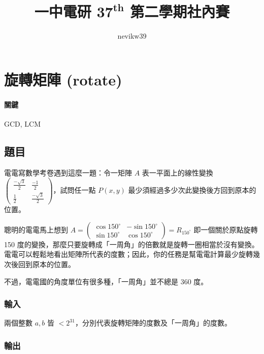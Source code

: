 \documentclass[a4paper,10pt]{article}
\title{\fontseries{b}一中電研 $\mathbf{37^{th}}$ 第二學期社內賽 \enspace {\huge\fontseries{eb}\selectfont 題目解析}}
\author{\fontshape{it}nevikw39}
\begin{document}
\maketitle

\begin{abstract}


\end{abstract}

\section{旋轉矩陣 (rotate)}

\paragraph{關鍵} GCD, LCM

\subsection{題目}

電電寫數學考卷遇到這麼一題：令一矩陣 $A$ 表一平面上的線性變換 $\begin{pmatrix} \frac{-\sqrt{3}}{2} & \frac{-1}{2}\\ \frac{1}{2} & \frac{-\sqrt{3}}{2} \end{pmatrix}$，試問任一點 $P(x, y)$ 最少須經過多少次此變換後方回到原本的位置。

聰明的電電馬上想到 $A = \begin{pmatrix} \cos 150^{\circ} & -\sin 150^{\circ}\\ \sin 150^{\circ} & \cos 150^{\circ} \end{pmatrix} = R_{150^{\circ}}$ 即一個關於原點旋轉 150 度的變換，那麼只要旋轉成「一周角」的倍數就是旋轉一圈相當於沒有變換。電電可以輕鬆地看出矩陣所代表的度數；因此，你的任務是幫電電計算最少旋轉幾次後回到原本的位置。

不過，電電國的角度單位有很多種，「一周角」並不總是 360 度。

\subsubsection{輸入}

兩個整數 $a, b$ 皆 $< 2^{31}$，分別代表旋轉矩陣的度數及「一周角」的度數。

\subsubsection{輸出}
\end{document}
